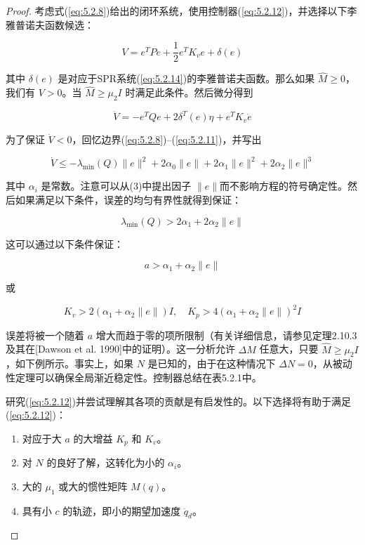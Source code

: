 \documentclass[UTF8,12pt,a4paper]{ctexart}
\begin{document}
\begin{proof}
考虑式(\ref{eq:5.2.8})给出的闭环系统，使用控制器(\ref{eq:5.2.12})，并选择以下李雅普诺夫函数候选：

\begin{equation}
V = e^T P e + \frac{1}{2}e^T K_v e + \delta(e)
\end{equation}

其中 $\delta(e)$ 是对应于SPR系统(\ref{eq:5.2.14})的李雅普诺夫函数。那么如果 $\hat{M} \geq 0$，我们有 $V > 0$。当 $\hat{M} \geq \mu_2 I$ 时满足此条件。然后微分得到

\begin{equation}
\dot{V} = -e^T Q e + 2\delta^T(e)\eta + e^T K_v \dot{e}
\end{equation}

为了保证 $\dot{V} < 0$，回忆边界(\ref{eq:5.2.8})--(\ref{eq:5.2.11})，并写出

\begin{equation}
\dot{V} \leq -\lambda_{\min}(Q)\|e\|^2 + 2\alpha_0\|e\| + 2\alpha_1\|e\|^2 + 2\alpha_2\|e\|^3
\end{equation}

其中 $\alpha_i$ 是常数。注意可以从(3)中提出因子 $\|e\|$而不影响方程的符号确定性。然后如果满足以下条件，误差的均匀有界性就得到保证：

\begin{equation}
\lambda_{\min}(Q) > 2\alpha_1 + 2\alpha_2\|e\|
\end{equation}

这可以通过以下条件保证：

\begin{equation}
a > \alpha_1 + \alpha_2\|e\|
\end{equation}

或

\begin{equation}
K_v > 2(\alpha_1 + \alpha_2\|e\|)I, \quad K_p > 4(\alpha_1 + \alpha_2\|e\|)^2 I
\end{equation}

误差将被一个随着 $a$ 增大而趋于零的项所限制（有关详细信息，请参见定理2.10.3及其在[Dawson et al. 1990]中的证明）。这一分析允许 $\Delta M$ 任意大，只要 $\hat{M} \geq \mu_2 I$，如下例所示。事实上，如果 $N$ 是已知的，由于在这种情况下 $\Delta N = 0$，从被动性定理可以确保全局渐近稳定性。控制器总结在表5.2.1中。

研究(\ref{eq:5.2.12})并尝试理解其各项的贡献是有启发性的。以下选择将有助于满足(\ref{eq:5.2.12})：
\begin{enumerate}
    \item 对应于大 $a$ 的大增益 $K_p$ 和 $K_v$。
    \item 对 $N$ 的良好了解，这转化为小的 $\alpha_i$。
    \item 大的 $\mu_1$ 或大的惯性矩阵 $M(q)$。
    \item 具有小 $c$ 的轨迹，即小的期望加速度 $\ddot{q}_d$。
\end{enumerate}
\end{proof}
\end{document}
